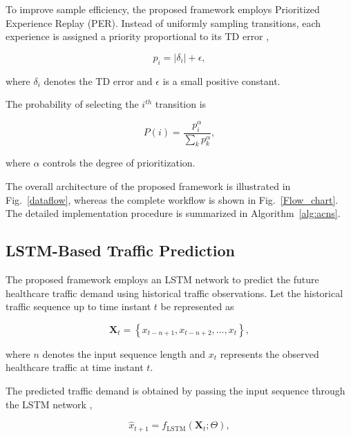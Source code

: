 \documentclass[10pt,journal,compsoc]{IEEEtran}
\begin{document}
To improve sample efficiency, the proposed framework employs Prioritized Experience Replay (PER). Instead of uniformly sampling transitions, each experience is assigned a priority proportional to its TD error \cite{sarker2026prioritybw},

\begin{equation}
p_i=|\delta_i|+\epsilon,
\end{equation}

where $\delta_i$ denotes the TD error and $\epsilon$ is a small positive constant.

The probability of selecting the $i^{th}$ transition is \cite{sarker2026prioritybw}

\begin{equation}
P(i)=
\frac{p_i^\alpha}
{\sum_k p_k^\alpha},
\end{equation}

where $\alpha$ controls the degree of prioritization.

The overall architecture of the proposed framework is illustrated in Fig.~\ref{dataflow}, whereas the complete workflow is shown in Fig.~\ref{Flow_chart}. The detailed implementation procedure is summarized in Algorithm~\ref{alg:acns}.


\subsection{LSTM-Based Traffic Prediction}
\label{LSTM}

The proposed framework employs an LSTM network to predict the future healthcare traffic demand using historical traffic observations. Let the historical traffic sequence up to time instant $t$ be represented as \cite{kumar2025lstmddpg}

\begin{equation}
\mathbf{X}_{t}=
\left\{
x_{t-n+1},
x_{t-n+2},
\ldots,
x_t
\right\},
\label{TrafficSequence}
\end{equation}

where $n$ denotes the input sequence length and $x_t$ represents the observed healthcare traffic at time instant $t$.

The predicted traffic demand is obtained by passing the input sequence through the LSTM network \cite{kumar2025lstmddpg},

\begin{equation}
\hat{x}_{t+1}
=
f_{\mathrm{LSTM}}
(\mathbf{X}_t;\Theta),
\label{TrafficPrediction}
\end{equation}
\end{document}

